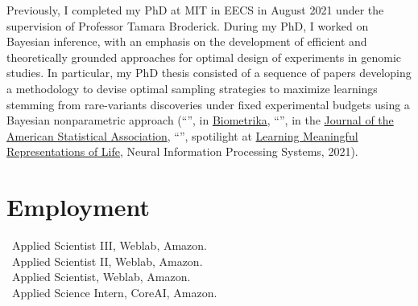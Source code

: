 \documentclass[10pt, a4paper]{article}
\newcommand{\years}[1]{\marginnote{\scriptsize #1}}
\begin{document}
Previously, I completed my PhD at MIT in EECS in August 2021 under the supervision of Professor Tamara Broderick. 
During my PhD, I worked on Bayesian inference, with an emphasis on the development of efficient and theoretically grounded approaches for optimal design of experiments in genomic studies. In particular, my PhD thesis consisted of a sequence of papers developing a methodology to devise optimal sampling strategies to maximize learnings stemming from rare-variants discoveries under fixed experimental budgets  using a Bayesian nonparametric approach (``\href{https://academic.oup.com/biomet/article-abstract/109/1/17/6146908?redirectedFrom=fulltext}{\color{blue}{More for Less: Predicting and maximizing genetic variant discovery via Bayesian nonparametrics}}'', in \href{https://academic.oup.com/biomet/advance-article-abstract/doi/10.1093/biomet/asab012/6146908?redirectedFrom=PDF}{Biometrika}, ``\href{https://www.tandfonline.com/doi/full/10.1080/01621459.2022.2115918}{\color{blue}{Scaled process priors: Improved predictions and uncertainties for new-feature counts via random scaling in Bayesian nonparametrics}}'', in the \href{https://www.tandfonline.com/doi/full/10.1080/01621459.2022.2115918}{Journal of the American Statistical Association},  ``\href{https://arxiv.org/abs/2112.02032}{\color{blue}{Bayesian nonparametric strategies for power maximization in rare variants association studies}}'', spotilight at \href{https://www.lmrl.org/}{Learning Meaningful Representations of Life},  Neural Information Processing Systems, 2021).
%
\section*{Employment}
\noindent
\years{2024-}\ Applied Scientist III, Weblab, Amazon.\\
\years{2022-2023}\ Applied Scientist II, Weblab, Amazon.\\
\years{2021}\ Applied Scientist, Weblab, Amazon. \\
\years{2020}\ Applied Science Intern, CoreAI, Amazon. \\
\end{document}
